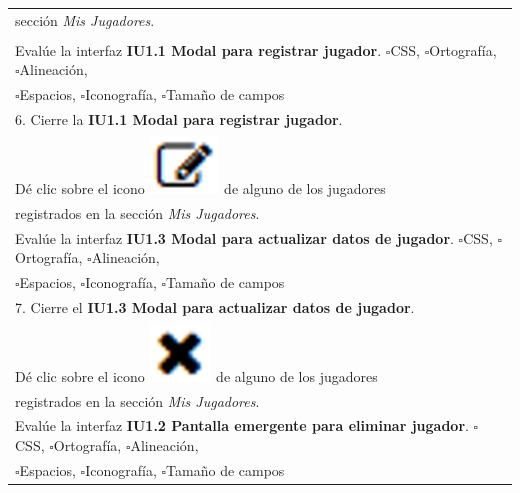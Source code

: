 \documentclass[oneside,10pt]{book}
\begin{document}
\begin{tabularx}{\textwidth}{ l l l X }
\multicolumn{1}{|l|}{sección \textit{Mis Jugadores}.} & \multicolumn{1}{l|}{ } & \multicolumn{1}{l|}{ } & \multicolumn{1}{X|}{ } \\ 
\multicolumn{1}{|l|}{ } & \multicolumn{1}{l|}{ } & \multicolumn{1}{l|}{ } & \multicolumn{1}{X|}{ } \\ \hline
\multicolumn{4}{|l|}{Evalúe la interfaz \textbf{IU1.1 Modal para registrar jugador}. $\square$CSS, $\square$Ortografía, $\square$Alineación,}                        \\
\multicolumn{4}{|l|}{$\square$Espacios, $\square$Iconografía, $\square$Tamaño de campos}                        \\ \hline

\multicolumn{1}{|l|}{6. Cierre la \textbf{IU1.1 Modal para registrar jugador}.} & \multicolumn{1}{l|}{}   & \multicolumn{1}{l|}{}   & \multicolumn{1}{X|}{}              \\
\multicolumn{1}{|l|}{Dé clic sobre el icono \includegraphics[scale=.3]{images/edit} de alguno de los jugadores} & \multicolumn{1}{l|}{ } & \multicolumn{1}{l|}{ } & \multicolumn{1}{X|}{ } \\ 
\multicolumn{1}{|l|}{registrados en la sección \textit{Mis Jugadores}.} & \multicolumn{1}{l|}{ } & \multicolumn{1}{l|}{ } & \multicolumn{1}{X|}{ } \\ \hline
\multicolumn{4}{|l|}{Evalúe la interfaz \textbf{IU1.3 Modal para actualizar datos de jugador}. $\square$CSS, $\square$Ortografía, $\square$Alineación,}                        \\
\multicolumn{4}{|l|}{$\square$Espacios, $\square$Iconografía, $\square$Tamaño de campos}                        \\ \hline

\multicolumn{1}{|l|}{7. Cierre el \textbf{IU1.3 Modal para actualizar datos de jugador}.} & \multicolumn{1}{l|}{}   & \multicolumn{1}{l|}{}   & \multicolumn{1}{X|}{}              \\
\multicolumn{1}{|l|}{Dé clic sobre el icono \includegraphics[scale=.3]{images/eliminate} de alguno de los jugadores} & \multicolumn{1}{l|}{ } & \multicolumn{1}{l|}{ } & \multicolumn{1}{X|}{ } \\ 
\multicolumn{1}{|l|}{registrados en la sección \textit{Mis Jugadores}.} & \multicolumn{1}{l|}{ } & \multicolumn{1}{l|}{ } & \multicolumn{1}{X|}{ } \\ \hline
\multicolumn{4}{|l|}{Evalúe la interfaz \textbf{IU1.2 Pantalla emergente para eliminar jugador}. $\square$CSS, $\square$Ortografía, $\square$Alineación,}                        \\
\multicolumn{4}{|l|}{$\square$Espacios, $\square$Iconografía, $\square$Tamaño de campos}                        \\ \hline
\end{tabularx}
\end{document}
